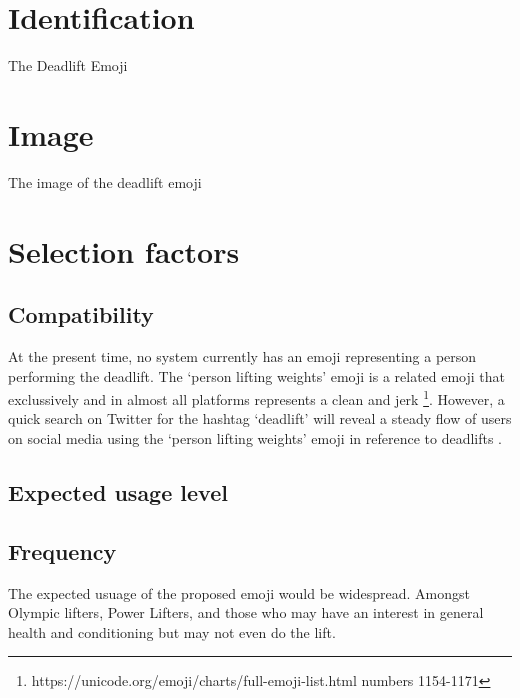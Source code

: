\documentclass{article}
\begin{document}
\newcommand{\emojiname}{`person deadlifting'}
\begin{abstract}
The intention of this proposal is to advocate for the inclusion of a new emoji, \emojiname{} , as a Unicode emoji character. 
Amongst professional Power Lifters, professional Olympic lifters, and amature lifters the deadlift is a core training lift. 
For Power Lifters, it is one of the three lifts in competition. For Olympic lifters, it is the first phase of all lifts recognised by the International Olympic Commitee
\end{abstract}
\section{Identification}
The Deadlift Emoji

\section{Image}
The image of the deadlift emoji

\section{Selection factors}
\subsection{Compatibility}
At the present time, no system currently has an emoji representing a person performing the deadlift. The `person lifting weights' emoji is a related emoji that
exclussively and in almost all platforms represents a clean and jerk \footnote{https://unicode.org/emoji/charts/full-emoji-list.html numbers 1154-1171}.
However, a quick search on Twitter for the hashtag `deadlift' will reveal a steady flow of users on social media using the `person lifting weights' emoji in reference to deadlifts .

\subsection{Expected usage level}
\subsection{Frequency}
The expected usuage of the proposed emoji would be widespread. Amongst Olympic lifters, Power Lifters, and those who may have an interest in general health and conditioning but may not even do the
lift.
\end{document}

